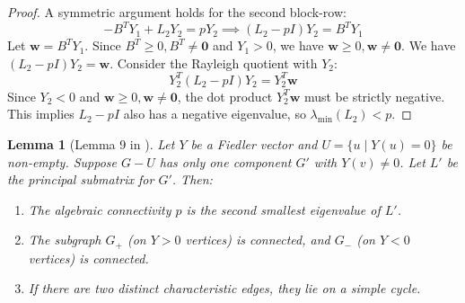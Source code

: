 \documentclass[12pt,a4paper]{report}
\theoremstyle{plain}
\newtheorem{lemma}[theorem]{Lemma}
\theoremstyle{definition}
\theoremstyle{remark}
\begin{document}
\begin{proof}
A symmetric argument holds for the second block-row:
$$ -B^T Y_1 + L_2 Y_2 = p Y_2 \implies (L_2 - pI)Y_2 = B^T Y_1 $$
Let $\bm{w} = B^T Y_1$. Since $B^T \ge 0, B^T \ne \mathbf{0}$ and $Y_1 > 0$, we have $\bm{w} \ge 0, \bm{w} \ne \bm{0}$.
We have $(L_2 - pI)Y_2 = \bm{w}$. Consider the Rayleigh quotient with $Y_2$:
$$ Y_2^T (L_2 - pI) Y_2 = Y_2^T \bm{w} $$
Since $Y_2 < 0$ and $\bm{w} \ge 0, \bm{w} \ne \bm{0}$, the dot product $Y_2^T \bm{w}$ must be strictly negative.
This implies $L_2 - pI$ also has a negative eigenvalue, so $\lambda_{\min}(L_2) < p$.
\end{proof}

\begin{lemma}[Lemma 9 in \cite{main_paper}]
Let $Y$ be a Fiedler vector and $U = \{u \mid Y(u) = 0\}$ be non-empty. Suppose $G-U$ has only one component $G'$ with $Y(v) \ne 0$. Let $L'$ be the principal submatrix for $G'$. Then:
\begin{enumerate}
    \item[(i)] The algebraic connectivity $p$ is the second smallest eigenvalue of $L'$.
    \item[(ii)] The subgraph $G_+$ (on $Y>0$ vertices) is connected, and $G_-$ (on $Y<0$ vertices) is connected.
    \item[(iii)] If there are two distinct characteristic edges, they lie on a simple cycle.
\end{enumerate}
\end{lemma}
\end{document}
